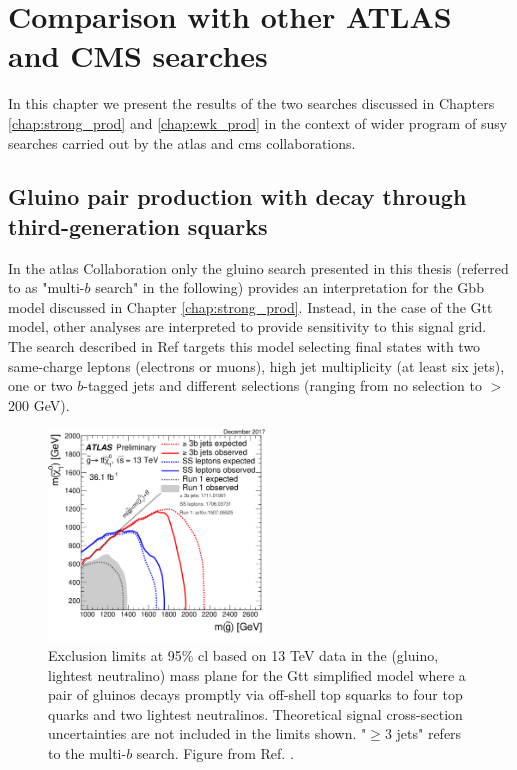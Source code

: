 \chapter{Comparison with other ATLAS and CMS searches}
\label{chap:summary_susy}

In this chapter we present the results of the two searches discussed in Chapters \ref{chap:strong_prod} and \ref{chap:ewk_prod} in the context of
wider program of \gls{susy} searches carried out by the \gls{atlas} and \gls{cms} collaborations. 

\section{Gluino pair production with decay through third-generation squarks}

In the \gls{atlas} Collaboration only the gluino search presented in this thesis (referred to as "multi-$b$ search" in the following) 
provides an interpretation for the Gbb model 
discussed in Chapter \ref{chap:strong_prod}.
Instead, in the case of the Gtt model, other analyses 
are interpreted to provide sensitivity  to this 
signal grid. 
The search described in Ref \cite{Aaboud:2017dmy} targets this model selecting final states with two same-charge 
leptons (electrons or muons), high jet multiplicity (at least six jets), one or two $b$-tagged jets and different \met selections 
(ranging from no \met selection to \met $>$ 200 GeV).

\begin{figure}[htbp]
	\centering
	\includegraphics[width=0.52\textwidth]{figures/summary_plots/ATLAS_SUSY_Gtt.pdf}
	\caption{Exclusion limits at 95\% \gls{cl} based on 13 TeV data in the (gluino, lightest neutralino) 
	mass plane for the Gtt simplified model where a pair of gluinos decays promptly via off-shell top 
	squarks to four top quarks and two lightest neutralinos. Theoretical signal cross-section uncertainties are 
	not included in the limits shown. "$\geq 3$ jets" refers to the multi-$b$ search. Figure from Ref. \cite{atlasSUSYSummary}.
	} 
	\label{fig:summary_atlas_Gtt}
\end{figure}

